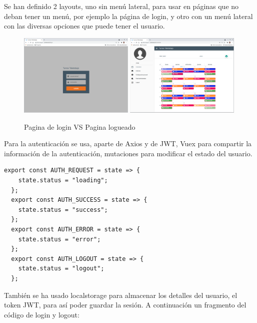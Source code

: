 \documentclass[11pt,spanish,listoffigures,listoftables]{tfgetsinf}
\begin{document}
Se han definido 2 layouts, uno sin menú lateral, para usar en páginas que no deban tener un menú, por ejemplo la página de login, y otro con un menú lateral con las diversas opciones que puede tener el usuario.

\begin{figure}[ht!] %
  \includegraphics[width=0.49\textwidth]{img/loginweb.png}
  \includegraphics[width=0.49\textwidth]{img/calendarioweb.png}
  \caption{Pagina de login VS Pagina logueado}
  \label{fig:loginvscalendario}
\end{figure}

Para la autenticación se usa, aparte de Axios y de JWT, Vuex para compartir la información de la autenticación, mutaciones para modificar el estado del usuario. 
\begin{lstlisting}[style=ES6, caption={Estados Vuex autenticación}]
  export const AUTH_REQUEST = state => {
    state.status = "loading";
  };
  export const AUTH_SUCCESS = state => {
    state.status = "success";
  };
  export const AUTH_ERROR = state => {
    state.status = "error";
  };
  export const AUTH_LOGOUT = state => {
    state.status = "logout";
  };
\end{lstlisting}

También se ha usado localstorage para almacenar los detalles del usuario, el token JWT, para así poder guardar la sesión. 
\clearpage
A continuación un fragmento del código de login y logout:
\end{document}
